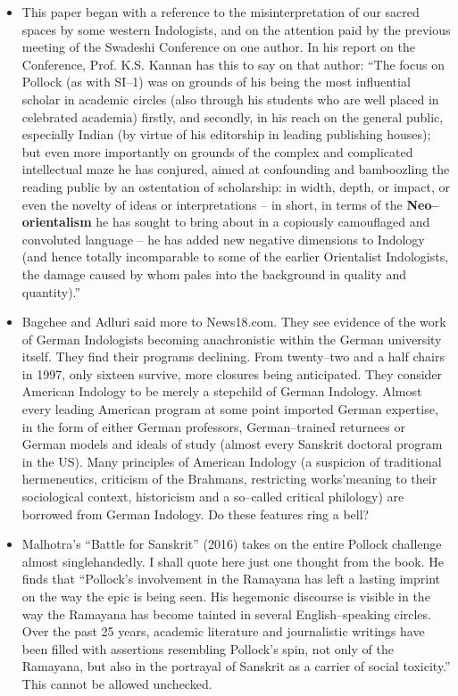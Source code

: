 \begin{itemize}
\item This paper began with a reference to the misinterpretation of our sacred spaces by some western Indologists, and on the attention paid by the previous meeting of the Swadeshi Conference on one author. In his report on the Conference, Prof. K.S. Kannan has this to say on that author: “The focus on Pollock (as with SI–1) was on grounds of his being the most influential scholar in academic circles (also through his students who are well placed in celebrated academia) firstly, and secondly, in his reach on the general public, especially Indian (by virtue of his editorship in leading publishing houses); but even more importantly on grounds of the complex and complicated intellectual maze he has conjured, aimed at confounding and bamboozling the reading public by an ostentation of scholarship: in width, depth, or impact, or even the novelty of ideas or interpretations – in short, in terms of the \textbf{Neo–orientalism} he has sought to bring about in a copiously camouflaged and convoluted language – he has added new negative dimensions to Indology (and hence totally incomparable to some of the earlier Orientalist Indologists, the damage caused by whom pales into the background in quality and quantity).”

 \item Bagchee and Adluri said more to News18.com. They see evidence of the work of German Indologists becoming anachronistic within the German university itself. They find their programs declining. From twenty–two and a half chairs in 1997, only sixteen survive, more closures being anticipated. They consider American Indology to be merely a stepchild of German Indology. Almost every leading American program at some point imported German expertise, in the form of either German professors, German–trained returnees or German models and ideals of study (almost every Sanskrit doctoral program in the US). Many principles of American Indology (a suspicion of traditional hermeneutics, criticism of the Brahmans, restricting works’\break meaning to their sociological context, historicism and a so–called critical philology) are borrowed from German Indology. Do these features ring a bell?

 \item Malhotra’s “Battle for Sanskrit” (2016) takes on the entire Pollock challenge almost singlehandedly. I shall quote here just one thought from the book. He finds that “Pollock’s involvement in the Ramayana has left a lasting imprint on the way the epic is being seen. His hegemonic discourse is visible in the way the Ramayana has become tainted in several English–speaking circles. Over the past 25 years, academic literature and journalistic writings have been filled with assertions resembling Pollock’s spin, not only of the Ramayana, but also in the portrayal of Sanskrit as a carrier of social toxicity.” This cannot be allowed unchecked.


\end{itemize}
